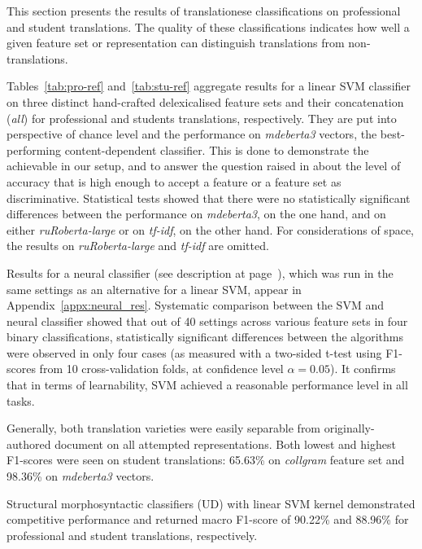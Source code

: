 This section presents the results of translationese classifications on professional and student translations. The quality of these classifications indicates how well a given feature set or representation can distinguish translations from non-translations. 

Tables~\ref{tab:pro-ref} and~\ref{tab:stu-ref} aggregate results for a linear SVM classifier on three distinct hand-crafted delexicalised feature sets and their concatenation (\textit{all}) for professional and students translations, respectively. 
They are put into perspective of chance level and the performance on \textit{mdeberta3} vectors, the best-performing content-dependent classifier.
This is done to demonstrate the achievable in our setup, and to answer the question raised in \citet{Hu2021} about the level of accuracy that is high enough to accept a feature or a feature set as discriminative. Statistical tests showed that there were no statistically significant differences between the performance on \textit{mdeberta3}, on the one hand, and on either \textit{ruRoberta-large} or on \textit{tf-idf}, on the other hand. For considerations of space, the results on \textit{ruRoberta-large} and \textit{tf-idf} are omitted.

Results for a neural classifier (see description at page~\pageref{pg:neural}), which was run in the same settings as an alternative for a linear SVM, appear in Appendix~\ref{appx:neural_res}. Systematic comparison between the SVM and neural classifier showed that out of 40 settings across various feature sets in four binary classifications, statistically significant differences between the algorithms were observed in only four cases (as measured with a two-sided t-test using F1-scores from 10 cross-validation folds, at confidence level $\alpha=0.05$). It confirms that in terms of learnability, SVM achieved a reasonable performance level in all tasks. 

Generally, both translation varieties were easily separable from originally-authored document on all attempted representations. Both lowest and highest F1-scores were seen on student translations: 65.63\% on \textit{collgram} feature set and 98.36\% on \textit{mdeberta3} vectors. 

Structural morphosyntactic classifiers (UD) with linear SVM kernel demonstrated competitive performance and returned macro F1-score of 90.22\% and 88.96\% for professional and student translations, respectively.


